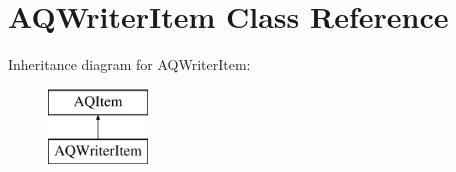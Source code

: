 \hypertarget{class_a_q_writer_item}{}\section{A\+Q\+Writer\+Item Class Reference}
\label{class_a_q_writer_item}
Inheritance diagram for A\+Q\+Writer\+Item\+:\begin{figure}[H]
\begin{center}
\leavevmode
\includegraphics[height=2.000000cm]{class_a_q_writer_item}
\end{center}
\end{figure}
